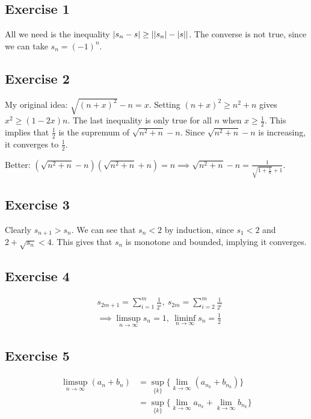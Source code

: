 \newpage

\subsection{Exercise 1}
All we need is the inequality $\abs{s_n - s} \geq \abs{\abs{s_n} - \abs{s}}$.
The converse is not true, since we can take $s_n = (-1)^n$.

\subsection{Exercise 2}
My original idea: $\sqrt{(n + x)^2} - n = x$. Setting $(n + x)^2 \geq n^2 + n$ gives
$x^2 \geq (1 - 2x) n$. The last inequality is only true for all $n$ when $x \geq \frac{1}{2}$.
This implies that $\frac{1}{2}$ is the supremum of $\sqrt{n^2 + n} - n$. Since 
$\sqrt{n^2 + n} - n$ is increasing, it converges to $\frac{1}{2}$.

Better: $(\sqrt{n^2 + n} - n) (\sqrt{n^2 + n} + n) = n \implies \sqrt{n^2 + n} - n = \frac{1}{\sqrt{1 + \frac{1}{n}} + 1}$.

\subsection{Exercise 3}
Clearly $s_{n + 1} > s_n$. We can see that $s_n < 2$ by induction, since $s_1 < 2$ and
$2 + \sqrt{s_n} < 4$. This gives that $s_n$ is monotone and bounded, implying it converges.

\subsection{Exercise 4}
\begin{align*}
&s_{2m + 1} = \sum_{i = 1}^{m} \frac{1}{2^i}, \: s_{2m} = \sum_{i = 2}^{m} \frac{1}{2^i} \\
&\implies \limsup_{n \to \infty} s_n = 1, \: \liminf_{n \to \infty} s_n = \frac{1}{2}
\end{align*}

\subsection{Exercise 5}
\begin{align*}
        \limsup_{n \to \infty} (a_n + b_n) &= \sup_{\{k\}}{\{\lim_{k \to \infty} (a_{n_k} + b_{n_k})\}} \\
                                           &= \sup_{\{k\}}{\{\lim_{k \to \infty} a_{n_k} + \lim_{k \to \infty} b_{n_k}\}}
\end{align*}


